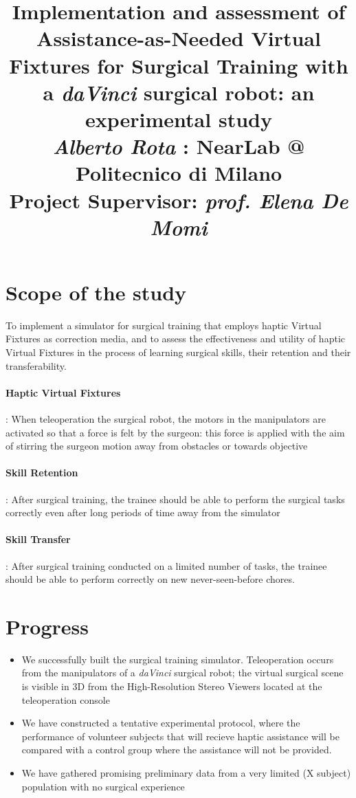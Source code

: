 \documentclass{article}
\title{\textbf{Implementation and assessment of Assistance-as-Needed Virtual Fixtures for Surgical Training with a \textit{daVinci} surgical robot: an experimental study}
\\
\vspace{0.5cm}\large{\textit{Alberto Rota} : NearLab @ Politecnico di Milano}
\\
\vspace{0.4cm}\small{Project Supervisor: \textit{prof. Elena De Momi}}
}
\author{}
\date{}
\begin{document}
\maketitle

\section{Scope of the study}
To implement a simulator for surgical training that employs haptic Virtual Fixtures as correction media, and to assess the effectiveness and utility of haptic Virtual Fixtures in the process of learning surgical skills, their retention and their transferability.

\paragraph*{Haptic Virtual Fixtures}: When teleoperation the surgical robot, the motors in the manipulators are activated so that a force is felt by the surgeon: this force is applied with the aim of stirring the surgeon motion away from obstacles or towards objective
\paragraph*{Skill Retention}: After surgical training, the trainee should be able to perform the surgical tasks correctly even after long periods of time away from the simulator
\paragraph*{Skill Transfer}: After surgical training conducted on a limited number of tasks, the trainee should be able to perform correctly on new never-seen-before chores.

\section{Progress}
\begin{itemize}
  \item  We successfully built the surgical training simulator. Teleoperation occurs from the manipulators of a \textit{daVinci} surgical robot; the virtual surgical scene is visible in 3D from the High-Resolution Stereo Viewers located at the teleoperation console
  \item We have constructed a tentative experimental protocol, where the performance of volunteer subjects that will recieve haptic assistance will be compared with a control group where the assistance will not be provided.
  \item We have gathered promising preliminary data from a very limited (X subject) population with no surgical experience
\end{itemize}
\end{document}

